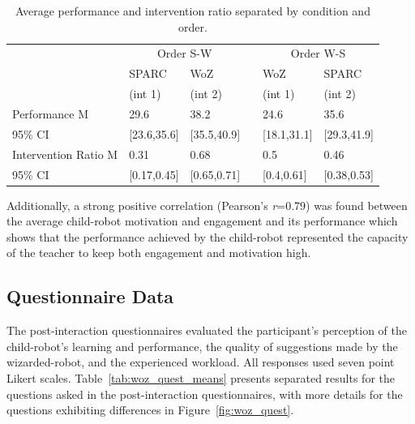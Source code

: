 \begin{table}[t]
	\caption{Average performance and intervention ratio separated by condition and order.}
	\centering
\begin{tabular}{@{}lllcll@{}}\toprule
	& \multicolumn{2}{c}{Order S-W} & \phantom{abc} & \multicolumn{2}{c}{Order W-S} \\
	\cmidrule{2-3} \cmidrule{5-6}
	& SPARC & WoZ && WoZ & SPARC \\
	& (int 1) & (int 2) && (int 1) & (int 2) \\
	\midrule			
Performance M & 29.6 & 38.2 && 24.6 & 35.6 \\
95\% CI & [23.6,35.6] & [35.5,40.9] && [18.1,31.1] & [29.3,41.9]\\[.2cm]
Intervention Ratio M & 0.31 & 0.68 && 0.5 & 0.46 \\
95\% CI & [0.17,0.45] & [0.65,0.71] && [0.4,0.61] & [0.38,0.53]\\
\bottomrule
\end{tabular}
\label{tab:woz_comp_means}
\end{table}

Additionally, a strong positive correlation (Pearson's \textit{r}=0.79) was found between the average child-robot motivation and engagement and its performance which shows that the performance achieved by the child-robot represented the capacity of the teacher to keep both engagement and motivation high.

\subsection{Questionnaire Data}

The post-interaction questionnaires evaluated the participant's perception of the child-robot's learning and performance, the quality of suggestions made by the wizarded-robot, and the experienced workload. All responses used seven point Likert scales. Table~\ref{tab:woz_quest_means} presents separated results for the questions asked in the post-interaction questionnaires, with more details for the questions exhibiting differences in Figure~\ref{fig:woz_quest}.

